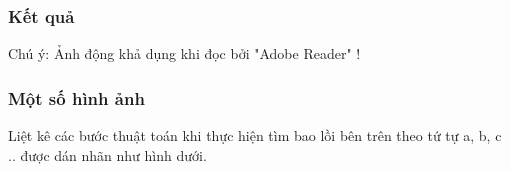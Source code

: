 \documentclass[12pt]{article}
\begin{document}
        \subsubsection*{Kết quả}
          \begin{frame}{}
            \centering
          \end{frame}
          \begin{center}
            Chú ý: Ảnh động khả dụng khi đọc bởi "Adobe Reader" !
          \end{center}
          \newpage
        \subsubsection*{Một số hình ảnh} 
          Liệt kê các bước thuật toán khi thực hiện tìm bao lồi bên trên theo tứ tự a, b, c .. được dán nhãn như hình dưới.
\end{document}
